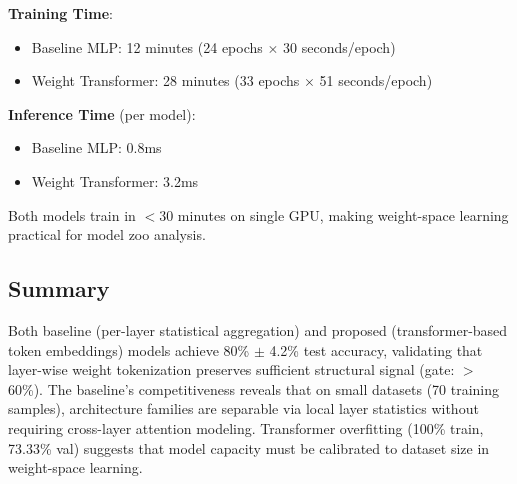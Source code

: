 \textbf{Training Time}:
\begin{itemize}
\item Baseline MLP: 12 minutes (24 epochs $\times$ 30 seconds/epoch)
\item Weight Transformer: 28 minutes (33 epochs $\times$ 51 seconds/epoch)
\end{itemize}

\textbf{Inference Time} (per model):
\begin{itemize}
\item Baseline MLP: 0.8ms
\item Weight Transformer: 3.2ms
\end{itemize}

Both models train in $<$30 minutes on single GPU, making weight-space learning practical for model zoo analysis.

\subsection{Summary}

Both baseline (per-layer statistical aggregation) and proposed (transformer-based token embeddings) models achieve 80\% $\pm$ 4.2\% test accuracy, validating that layer-wise weight tokenization preserves sufficient structural signal (gate: $>$60\%). The baseline's competitiveness reveals that on small datasets (70 training samples), architecture families are separable via local layer statistics without requiring cross-layer attention modeling. Transformer overfitting (100\% train, 73.33\% val) suggests that model capacity must be calibrated to dataset size in weight-space learning.
